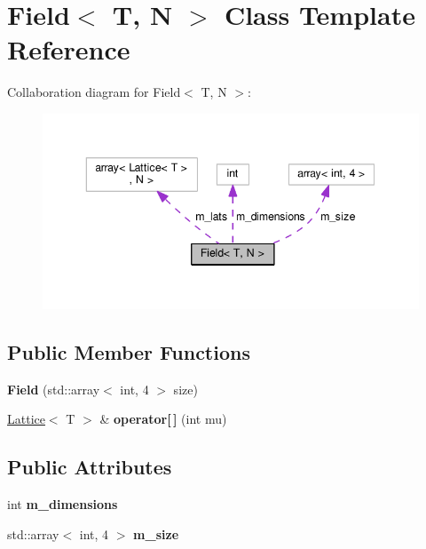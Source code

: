 \hypertarget{classField}{}\section{Field$<$ T, N $>$ Class Template Reference}
\label{classField}


Collaboration diagram for Field$<$ T, N $>$\+:\nopagebreak
\begin{figure}[H]
\begin{center}
\leavevmode
\includegraphics[width=343pt]{d3/d0e/classField__coll__graph}
\end{center}
\end{figure}
\subsection*{Public Member Functions}
\begin{DoxyCompactItemize}
\item 
{\bfseries Field} (std\+::array$<$ int, 4 $>$ size)\hypertarget{classField_a25a5869a0faa4d33782cbe9f277f684f}{}\label{classField_a25a5869a0faa4d33782cbe9f277f684f}

\item 
\hyperlink{classLattice}{Lattice}$<$ T $>$ \& {\bfseries operator\mbox{[}$\,$\mbox{]}} (int mu)\hypertarget{classField_a2c9ffced05a0a329395b2d9bca338840}{}\label{classField_a2c9ffced05a0a329395b2d9bca338840}

\end{DoxyCompactItemize}
\subsection*{Public Attributes}
\begin{DoxyCompactItemize}
\item 
int {\bfseries m\+\_\+dimensions}\hypertarget{classField_ada68c99dbc291529adcbc58c87273403}{}\label{classField_ada68c99dbc291529adcbc58c87273403}

\item 
std\+::array$<$ int, 4 $>$ {\bfseries m\+\_\+size}\hypertarget{classField_ae6a537c53432f6631a5e6eb624deea90}{}\label{classField_ae6a537c53432f6631a5e6eb624deea90}

\end{DoxyCompactItemize}
